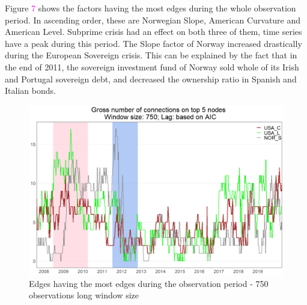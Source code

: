 \documentclass[12pt,bibliography=totoc]{article}
\begin{document}

Figure \textcolor{magenta}{7} shows the factors having the most edges during the whole observation period. In ascending order, these are Norwegian Slope, American Curvature and American Level. Subprime crisis had an effect on both three of them, time series have a peak during this period. The Slope factor of Norway increased drastically during the European Sovereign crisis. This can be explained by the fact that in the end of 2011, the sovereign investment fund of Norway sold whole of its Irish and Portugal sovereign debt, and decreased the ownership ratio in Spanish and Italian bonds.


\begin{figure}[H]
\includegraphics[width=11.5cm]{norway}
\centering
\caption{Edges having the most edges during the observation period - 750 observations long window size}
\end{figure}
\end{document}
